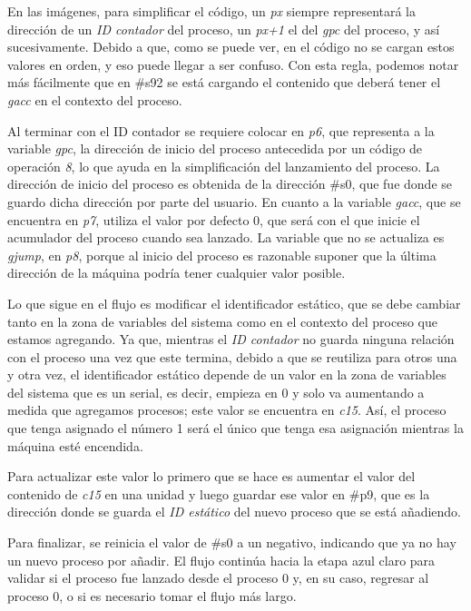 \documentclass[letterpaper,12pt,oneside]{book}
\begin{document}
			En las imágenes, para simplificar el código, un \textit{px} siempre representará la dirección de un \textit{ID contador} del proceso, un
			\textit{px+1} el del \textit{gpc} del proceso, y así sucesivamente. Debido a que, como se puede ver, en el código no se cargan estos valores 
			en orden,
			y eso puede llegar a ser confuso. Con esta regla, podemos notar más fácilmente que en \#s92 se está cargando el contenido que deberá tener
			el \textit{gacc} en el contexto del proceso.	
			
			Al terminar con el ID contador se requiere colocar en \textit{p6}, que representa a la variable \textit{gpc}, la dirección
			de inicio del proceso antecedida por un código de operación \textit{8}, lo que ayuda en la simplificación del lanzamiento del proceso.
			La dirección de inicio del proceso es obtenida de la dirección \#s0, que fue donde se guardo dicha dirección por parte del usuario.
			En cuanto a la variable \textit{gacc}, que se encuentra en \textit{p7}, utiliza el valor por defecto 0, que será
			con el que inicie el acumulador del proceso cuando sea lanzado. La variable que
			no se actualiza es \textit{gjump}, en \textit{p8}, porque al inicio del proceso es razonable suponer que la última dirección de la máquina
			podría tener cualquier valor posible.
            
            Lo que sigue en el flujo  es modificar el identificador estático, que se debe cambiar
			tanto en la zona de variables del sistema como en el contexto del proceso que estamos agregando. Ya que, mientras el \textit{ID contador} 
			no guarda 
			ninguna
			relación con el proceso una vez que este termina, debido a que se reutiliza para otros una y otra vez, el identificador estático depende de un 
			valor
			en la zona de variables del sistema que es un serial, es decir, empieza en 0 y solo va aumentando a medida que agregamos procesos; este
			valor se encuentra en \textit{c15}. Así, el 
			proceso que
			tenga asignado el número 1 será el único que tenga esa asignación mientras la máquina esté encendida. 
			
			Para actualizar este valor lo primero que se 
			hace es aumentar
			el valor del contenido de \textit{c15} en una unidad y luego guardar ese valor en \#p9, que es la dirección donde se guarda el 
			\textit{ID estático}
			del nuevo proceso que se está añadiendo.
			
			Para finalizar, se reinicia el valor de \#s0 a un negativo, indicando que ya no hay un nuevo proceso por añadir. El flujo continúa
			hacia la etapa azul claro para validar si el proceso fue lanzado desde el proceso 0 y, en su caso,
			regresar al proceso 0, o si es necesario tomar el flujo más largo.
	        
\end{document}
